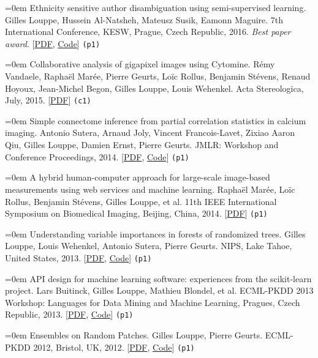\documentclass{scrartcl}
\newcommand{\MarginText}[1]{\marginpar{\raggedleft\itshape\small#1}}
\newcommand{\NewPublication}[4]{\noindent\hangindent=0em\hangafter=0 \MarginText{\color{black} #1}{\footnotesize [{\color{Maroon}#2}]} #3 {\footnotesize\color{gray}#4}\vspace{0.5em}}
\begin{document}
\begin{cv}{}
\NewPublication{}{9}{Ethnicity sensitive author disambiguation using semi-supervised learning.}{%
Gilles Louppe, Hussein Al-Natsheh, Mateusz Susik, Eamonn Maguire.
7th International Conference, KESW, Prague, Czech Republic, 2016. {\it Best paper award}.
[\href{http://arxiv.org/abs/1508.07744}{PDF}, \href{https://github.com/glouppe/paper-author-disambiguation/}{Code}]
{\color{black}\tt (p1)}}

\NewPublication{}{8}{Collaborative analysis of gigapixel images using Cytomine.}{%
R\'emy Vandaele, Rapha\"el Mar\'ee, Pierre Geurts, Lo\"ic Rollus, Benjamin St\'evens, Renaud Hoyoux, Jean-Michel Begon, Gilles Louppe, Louis Wehenkel.
Acta Stereologica, July, 2015.
[\href{http://popups.ulg.ac.be/0351-580X/index.php?id=3692&file=1&pid=3681}{PDF}]
{\color{black}\tt (c1)}}

\NewPublication{}{7}{Simple connectome inference from partial correlation statistics in calcium imaging.}{%
Antonio Sutera, Arnaud Joly, Vincent Francois-Lavet, Zixiao Aaron Qiu, Gilles Louppe, Damien Ernst, Pierre Geurts.
JMLR: Workshop and Conference Proceedings, 2014.
[\href{http://hdl.handle.net/2268/169767}{PDF}, \href{https://github.com/glouppe/kaggle-connectomics}{Code}]
{\color{black}\tt (p1)}}

\NewPublication{}{6}{A hybrid human-computer approach for large-scale image-based measurements using web services and machine learning.}{%
Rapha\"el Mar{\'e}e, Lo\"ic Rollus, Benjamin St\'evens, Gilles Louppe, et al.
11th IEEE International Symposium on Biomedical Imaging, Beijing, China, 2014.
[\href{http://hdl.handle.net/2268/162084}{PDF}]
{\color{black}\tt (p1)}}

\NewPublication{}{5}{Understanding variable importances in forests of randomized trees.}{%
Gilles Louppe, Louis Wehenkel, Antonio Sutera, Pierre Geurts.
NIPS, Lake Tahoe, United States, 2013.
[\href{http://hdl.handle.net/2268/155642}{PDF}, \href{http://github.com/glouppe/paper-variable-importances}{Code}]
{\color{black}\tt (p1)}}

\NewPublication{}{4}{API design for machine learning software: experiences from the scikit-learn project.}{%
Lars Buitinck, Gilles Louppe, Mathieu Blondel, et al.
ECML-PKDD 2013 Workshop: Languages for Data Mining and Machine Learning, Pragues, Czech Republic, 2013.
[\href{http://hdl.handle.net/2268/154357}{PDF}, \href{http://github.com/scikit-learn/scikit-learn}{Code}]
{\color{black}\tt (p1)}}

\NewPublication{}{3}{Ensembles on Random Patches.}{%
Gilles Louppe, Pierre Geurts.
ECML-PKDD 2012, Bristol, UK, 2012.
[\href{http://hdl.handle.net/2268/130099}{PDF}, \href{http://github.com/scikit-learn/scikit-learn/blob/master/sklearn/ensemble/bagging.py}{Code}]
{\color{black}\tt (p1)}}


\end{cv}
\end{document}
